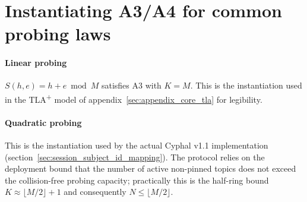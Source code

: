 \section{Instantiating A3/A4 for common probing laws}

\paragraph{Linear probing} $S(h, e) = h + e \bmod M$ satisfies A3 with
$K = M$. This is the instantiation used in the TLA\textsuperscript{+}
model of appendix~\ref{sec:appendix_core_tla} for legibility.

\paragraph{Quadratic probing} This is the instantiation used by the actual
Cyphal v1.1 implementation (section~\ref{sec:session_subject_id_mapping}).
The protocol relies on the deployment bound that the number of active
non-pinned topics does not exceed the collision-free probing capacity;
practically this is the half-ring bound $K \approx \lfloor M / 2 \rfloor + 1$
and consequently $N \le \lfloor M / 2 \rfloor$.
